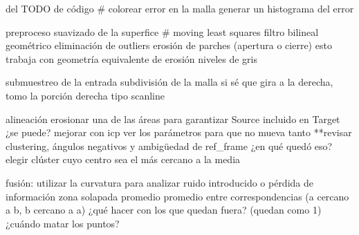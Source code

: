 del TODO de código
	# colorear error en la malla
	generar un histograma del error

	preproceso
		suavizado de la superfice
			# moving least squares
			filtro bilineal
			geométrico
		eliminación de outliers
			erosión de parches (apertura o cierre)
				esto trabaja con geometría
			equivalente de erosión niveles de gris

	submuestreo de la entrada
		subdivisión de la malla
			si sé que gira a la derecha, tomo la porción derecha
				tipo scanline

	alineación
		erosionar una de las áreas para garantizar Source incluido en Target
			¿se puede?
		mejorar con icp
			ver los parámetros para que no mueva tanto
		**revisar clustering, ángulos negativos y ambigüedad de ref_frame
			¿en qué quedó eso?
			elegir clúster cuyo centro sea el más cercano a la media

	fusión:
		utilizar la curvatura para analizar ruido introducido
		o pérdida de información
		zona solapada promedio
			promedio entre correspondencias (a cercano a b, b cercano a a)
				¿qué hacer con los que quedan fuera? (quedan como 1)
				¿cuándo matar los puntos?
